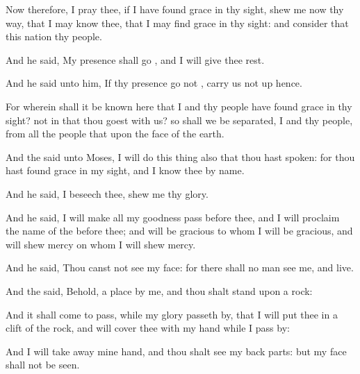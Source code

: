 {Now therefore, I pray thee, if I have
found
grace in thy
sight,
shew me now thy
way, that I may
know thee, that I may
find
grace in thy
sight: and
consider that this
nation
{} thy
people.

And he
said, My
presence shall
go
{}, and I will give thee
rest.

And he
said unto him, If thy
presence
go not
{}, carry us not
up hence.

For wherein shall it be
known
here that I and thy
people have
found
grace in thy
sight?
{} not in that thou
goest with us? so shall we be
separated, I and thy
people, from all the
people that
{} upon the
face of the
earth.

And the
{}
said unto
Moses, I will
do this
thing also that thou hast
spoken: for thou hast
found
grace in my
sight, and I
know thee by
name.

And he
said, I beseech
thee,
shew me thy
glory.

And he
said, I will make all my
goodness
pass before thee, and I will
proclaim the
name of the
{}
before thee; and will be
gracious to whom I will be
gracious, and will shew
mercy on whom I will shew
mercy.

And he
said, Thou
canst not
see my
face: for there shall no
man
see me, and
live.

And the
{}
said, Behold,
{} a
place by me, and thou shalt
stand upon a
rock:

And it shall come to pass, while my
glory passeth
by, that I will
put thee in a
clift of the
rock, and will
cover thee with my
hand
while I pass
by:

And I will
take away mine
hand, and thou shalt
see my back
parts: but my
face shall not be
seen.




\par }
